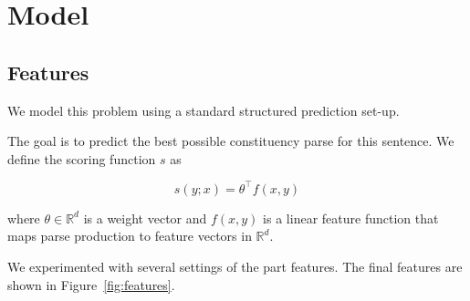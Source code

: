 \documentclass[11pt,letterpaper]{article}
\newcommand{\Reals}{\mathbb{R}}
\begin{document}





\section{Model}


\subsection{Features}

We model this problem using  a standard structured prediction set-up.

The goal is to predict the best possible constituency parse for this sentence.
We define the scoring function $s$ as

\[s(y;x) =  \theta^{\top} f(x, y) \]

where $\theta \in \Reals^d $ is a weight vector and $f(x, y)$ is a linear feature function
that maps parse production to feature vectors in $\Reals^d$.






We experimented with several settings of the part features. The final features are shown in  Figure~\ref{fig:features}.

\cite{}
\cite{}
\cite{}
\end{document}
